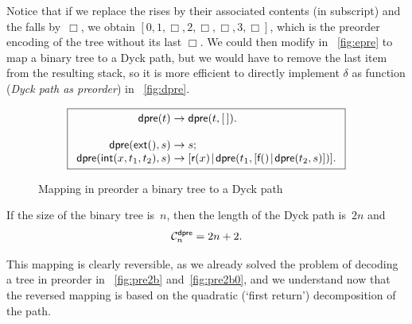 Notice that if we replace the rises by their associated contents (in
subscript) and the falls by~\(\Box\), we obtain \([0, 1, \Box, 2,
\Box, \Box, 3, \Box]\), which is the preorder encoding of the tree without its last \(\Box\). We
could then modify  in
\fig~\vref{fig:epre} to map a binary tree to a Dyck
path, but we would have to remove the last item from the resulting
stack, so it is more efficient to directly implement \(\delta\) as
function  (\emph{Dyck path as
  preorder}) in \fig~\vref{fig:dpre}.
\begin{figure}
\begin{equation*}
\boxed{
\begin{array}{r@{\;}c@{\;}l}
\fun{dpre}(t) & \rightarrow & \fun{dpre}(t,\el).\\
\\
\fun{dpre}(\fun{ext}(),s) & \rightarrow & s;\\
\fun{dpre}(\fun{int}(x,t_1,t_2),s)
  & \rightarrow
  & \cons{\fun{r}(x)}{\fun{dpre}(t_1,\cons{\fun{f}()}{\fun{dpre}(t_2,s)})}.
\end{array}}
\end{equation*}
\caption{Mapping in preorder a binary tree to a Dyck path}
\label{fig:dpre}
\end{figure}
If the size of the binary tree is~\(n\), then the length of the Dyck path
is~\(2n\) and
\begin{equation*}
  \C{\fun{dpre}}{n} = 2n+2.
  \index{dpre@$\C{\fun{dpre}}{n}$}
\end{equation*}

This mapping is clearly reversible, as we already solved the problem
of decoding a tree in preorder in
\figs~\ref{fig:pre2b}
and~\vref{fig:pre2b0}, and we
understand now that the reversed mapping is based on the quadratic
(`first return') decomposition of the path. 

